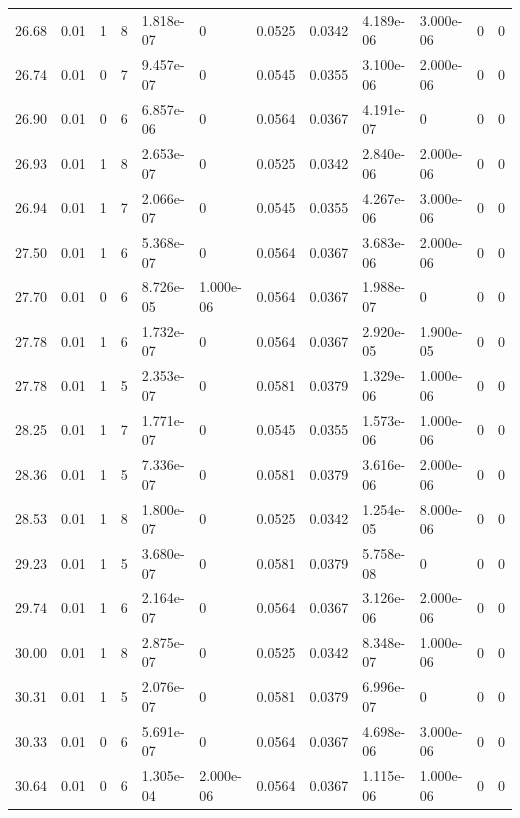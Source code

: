 \documentclass[preview]{standalone}
\begin{document}
{{{\begin{tabular}{L{1.2cm}C{1.2cm} C{0.3cm}C{0.5cm} C{1.4cm}C{1.4cm} C{1.4cm}C{1.4cm} C{1.6cm}C{1.6cm} C{1.6cm}C{1.6cm}}
  26.68  &  0.01  & 1     &  8 &  1.818e-07  & 0  &  0.0525&   0.0342& 4.189e-06 & 3.000e-06   &  0 & 0  \\ 
  26.74  &  0.01  & 0     &  7 &  9.457e-07  & 0  &  0.0545&   0.0355& 3.100e-06 & 2.000e-06   &  0 & 0  \\ 
  26.90  &  0.01  & 0     &  6 &  6.857e-06  & 0  &  0.0564&   0.0367& 4.191e-07 & 0   &  0 & 0  \\ 
  26.93  &  0.01  & 1     &  8 &  2.653e-07  & 0  &  0.0525&   0.0342& 2.840e-06 & 2.000e-06   &  0 & 0  \\ 
  26.94  &  0.01  & 1     &  7 &  2.066e-07  & 0  &  0.0545&   0.0355& 4.267e-06 & 3.000e-06   &  0 & 0  \\ 
  27.50  &  0.01  & 1     &  6 &  5.368e-07  & 0  &  0.0564&   0.0367& 3.683e-06 & 2.000e-06   &  0 & 0  \\ 
  27.70  &  0.01  & 0     &  6 &  8.726e-05  & 1.000e-06  &  0.0564&   0.0367& 1.988e-07 & 0   &  0 & 0  \\ 
  27.78  &  0.01  & 1     &  6 &  1.732e-07  & 0  &  0.0564&   0.0367& 2.920e-05 & 1.900e-05   &  0 & 0  \\ 
  27.78  &  0.01  & 1     &  5 &  2.353e-07  & 0  &  0.0581&   0.0379& 1.329e-06 & 1.000e-06   &  0 & 0  \\ 
  28.25  &  0.01  & 1     &  7 &  1.771e-07  & 0  &  0.0545&   0.0355& 1.573e-06 & 1.000e-06   &  0 & 0  \\ 
  28.36  &  0.01  & 1     &  5 &  7.336e-07  & 0  &  0.0581&   0.0379& 3.616e-06 & 2.000e-06   &  0 & 0  \\ 
  28.53  &  0.01  & 1     &  8 &  1.800e-07  & 0  &  0.0525&   0.0342& 1.254e-05 & 8.000e-06   &  0 & 0  \\ 
  29.23  &  0.01  & 1     &  5 &  3.680e-07  & 0  &  0.0581&   0.0379& 5.758e-08 & 0   &  0 & 0  \\ 
  29.74  &  0.01  & 1     &  6 &  2.164e-07  & 0  &  0.0564&   0.0367& 3.126e-06 & 2.000e-06   &  0 & 0  \\ 
  30.00  &  0.01  & 1     &  8 &  2.875e-07  & 0  &  0.0525&   0.0342& 8.348e-07 & 1.000e-06   &  0 & 0  \\ 
  30.31  &  0.01  & 1     &  5 &  2.076e-07  & 0  &  0.0581&   0.0379& 6.996e-07 & 0   &  0 & 0  \\ 
  30.33  &  0.01  & 0     &  6 &  5.691e-07  & 0  &  0.0564&   0.0367& 4.698e-06 & 3.000e-06   &  0 & 0  \\ 
  30.64  &  0.01  & 0     &  6 &  1.305e-04  & 2.000e-06  &  0.0564&   0.0367& 1.115e-06 & 1.000e-06   &  0 & 0  \\ 

\end{tabular}}}}
\end{document}
